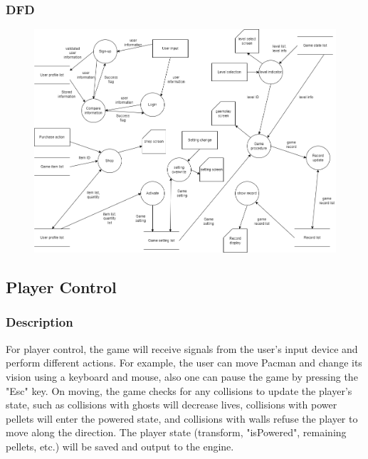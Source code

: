 \documentclass[11pt]{article}
\begin{document}
\subsubsection{DFD}
\begin{figure}[H]
    \centering
    \includegraphics*[scale=0.4]{gameflow_DFD.png}
\end{figure}

\subsection{Player Control}
\subsubsection{Description}
\par For player control, the game will receive signals from the user's input device and perform different actions. For example, the user can move Pacman and change its vision using a keyboard and mouse, also one can pause the game by pressing the "Esc" key. On moving, the game checks for any collisions to update the player's state, such as collisions with ghosts will decrease lives, collisions with power pellets will enter the powered state, and collisions with walls refuse the player to move along the direction. The player state (transform, "isPowered", remaining pellets, etc.) will be saved and output to the engine.
\end{document}
